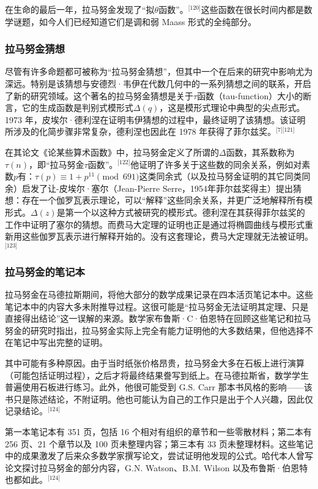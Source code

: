 在生命的最后一年，拉马努金发现了“拟$\theta$函数”。\(^\text{[120]}\)这些函数在很长时间内都是数学谜题，如今人们已经知道它们是调和弱 Maass 形式的全纯部分。
\subsubsection{拉马努金猜想}
尽管有许多命题都可被称为“拉马努金猜想”，但其中一个在后来的研究中影响尤为深远。特别是该猜想与安德烈·韦伊在代数几何中的一系列猜想之间的联系，开启了新的研究领域。这个著名的拉马努金猜想是关于$\tau$函数（tau-function）大小的断言，它的生成函数是判别式模形式$\Delta(q)$，这是模形式理论中典型的尖点形式。1973 年，皮埃尔·德利涅在证明韦伊猜想的过程中，最终证明了该猜想。该证明所涉及的化简步骤非常复杂，德利涅也因此在 1978 年获得了菲尔兹奖。\(^\text{[7][121]}\)

在其论文《论某些算术函数》中，拉马努金定义了所谓的$\Delta$函数，其系数称为$\tau(n)$，即“拉马努金$\tau$函数”。\(^\text{[122]}\)他证明了许多关于这些数的同余关系，例如对素数$p$有：$\tau(p) \equiv 1 + p^{11} \pmod{691}$这类同余式（以及拉马努金证明的其它同类同余）启发了让-皮埃尔·塞尔（Jean-Pierre Serre，1954年菲尔兹奖得主）提出猜想：存在一个伽罗瓦表示理论，可以“解释”这些同余关系，并更广泛地解释所有模形式。$\Delta(z)$是第一个以这种方式被研究的模形式。德利涅在其获得菲尔兹奖的工作中证明了塞尔的猜想。而费马大定理的证明也正是通过将椭圆曲线与模形式重新用这些伽罗瓦表示进行解释开始的。没有这套理论，费马大定理就无法被证明。\(^\text{[123]}\)
\subsubsection{拉马努金的笔记本}
拉马努金在马德拉斯期间，将他大部分的数学成果记录在四本活页笔记本中。这些笔记本中的内容大多未附推导过程。这很可能是“拉马努金无法证明其定理、只是直接得出结论”这一误解的来源。数学家布鲁斯·C·伯恩特在回顾这些笔记和拉马努金的研究时指出，拉马努金实际上完全有能力证明他的大多数结果，但他选择不在笔记中写出完整的证明。

其中可能有多种原因。由于当时纸张价格昂贵，拉马努金大多在石板上进行演算（可能包括证明过程），之后才将最终结果誊写到纸上。在马德拉斯省，数学学生普遍使用石板进行练习。此外，他很可能受到 G.S. Carr 那本书风格的影响——该书只是陈述结论，不附证明。他也可能认为自己的工作只是出于个人兴趣，因此仅记录结论。\(^\text{[124]}\)

第一本笔记本有 351 页，包括 16 个相对有组织的章节和一些零散材料；第二本有 256 页、21 个章节以及 100 页未整理内容；第三本有 33 页未整理材料。这些笔记中的成果激发了后来众多数学家撰写论文，尝试证明他发现的公式。哈代本人曾写论文探讨拉马努金的部分内容，G.N. Watson、B.M. Wilson 以及布鲁斯·伯恩特也都如此。\(^\text{[124]}\)

